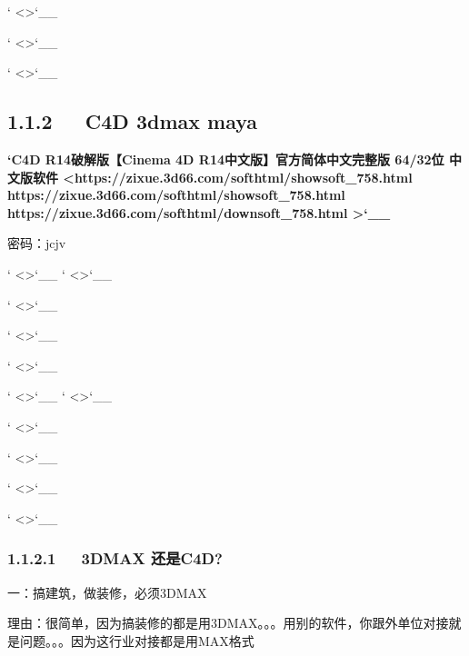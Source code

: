 \documentclass[letterpaper,12pt,english]{sphinxmanual}
\begin{document}
{}` \textless{}\textgreater{}{}`\_\_

{}` \textless{}\textgreater{}{}`\_\_

{}` \textless{}\textgreater{}{}`\_\_


\subsection{1.1.2   C4D 3dmax maya}
\label{\detokenize{000misc/extract:c4d-3dmax-maya}}
{\color{red}\bfseries{}{}`C4D R14破解版【Cinema 4D R14中文版】官方简体中文完整版 64/32位 中文版软件 \textless{}https://zixue.3d66.com/softhtml/showsoft\_758.html https://zixue.3d66.com/softhtml/showsoft\_758.html https://zixue.3d66.com/softhtml/downsoft\_758.html
\textgreater{}{}`\_\_}




密码：jcjv


{}` \textless{}\textgreater{}{}`\_\_
{}` \textless{}\textgreater{}{}`\_\_

{}` \textless{}\textgreater{}{}`\_\_

{}` \textless{}\textgreater{}{}`\_\_

{}` \textless{}\textgreater{}{}`\_\_

{}` \textless{}\textgreater{}{}`\_\_
{}` \textless{}\textgreater{}{}`\_\_

{}` \textless{}\textgreater{}{}`\_\_

{}` \textless{}\textgreater{}{}`\_\_

{}` \textless{}\textgreater{}{}`\_\_

{}` \textless{}\textgreater{}{}`\_\_


\subsubsection{1.1.2.1   3DMAX 还是C4D?}
\label{\detokenize{000misc/extract:dmax-c4d}}
一：搞建筑，做装修，必须3DMAX

理由：很简单，因为搞装修的都是用3DMAX。。。用别的软件，你跟外单位对接就是问题。。。因为这行业对接都是用MAX格式
\end{document}
